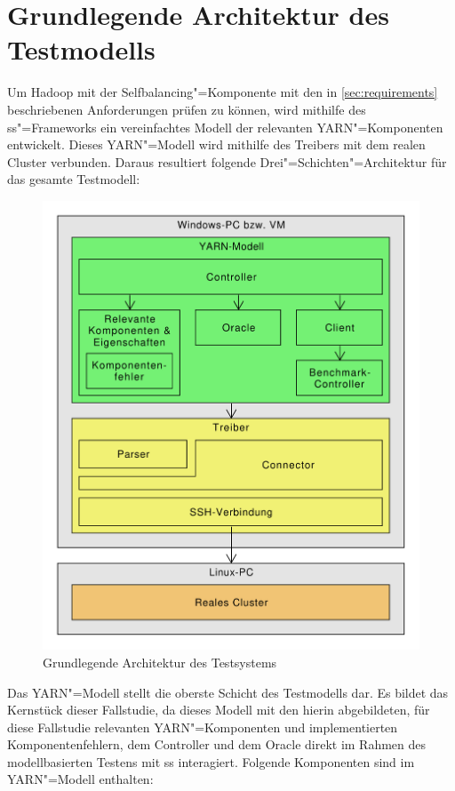\section{Grundlegende Architektur des Testmodells}
\label{sec:modelArchitecture}

Um Hadoop mit der Selfbalancing"=Komponente mit den in \cref{sec:requirements} beschriebenen Anforderungen prüfen zu können, wird mithilfe des \ac{ss}"=Frameworks ein vereinfachtes Modell der relevanten \ac{YARN}"=Komponenten entwickelt.
Dieses \ac{YARN}"=Modell wird mithilfe des Treibers mit dem realen Cluster verbunden.
Daraus resultiert folgende Drei"=Schichten"=Architektur für das gesamte Testmodell:

\begin{figure}[h]
    \includegraphics[width=0.6\columnwidth]{./resources/modelArchitecture.pdf}
    \caption{Grundlegende Architektur des Testsystems}
    \label{fig:modelArchitecture}
\end{figure}

Das \ac{YARN}"=Modell stellt die oberste Schicht des Testmodells dar.
Es bildet das Kernstück dieser Fallstudie, da dieses Modell mit den hierin abgebildeten, für diese Fallstudie relevanten \ac{YARN}"=Komponenten und implementierten Komponentenfehlern, dem Controller und dem Oracle direkt im Rahmen des modellbasierten Testens mit \ac{ss} interagiert.
Folgende Komponenten sind im \ac{YARN}"=Modell enthalten:

